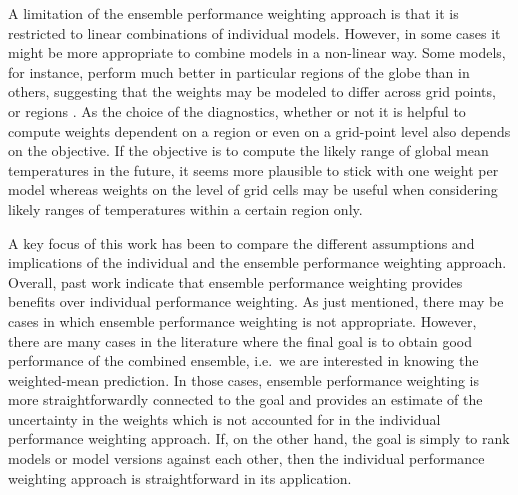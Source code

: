 A limitation of the ensemble performance weighting approach is that it is restricted to linear combinations of individual models. 
However, in some cases it might be more appropriate to combine models in a non-linear way.
Some models, for instance, perform much better in particular regions of the globe than in others, suggesting that the weights may be modeled to differ across grid points, or regions \citep[e.g.,][]{dasbhowmikPerformancebasedMultimodelCombination2021,thaoCombiningGlobalClimate2022}. 
As the choice of the diagnostics, whether or not it is helpful to compute weights dependent on a region or even on a grid-point level also depends on the objective. If the objective is to compute the likely range of global mean temperatures in the future, it seems more plausible to stick with one weight per model whereas weights on the level of grid cells may be useful when considering likely ranges of temperatures within a certain region only.

A key focus of this work has been to compare the different assumptions and implications of the individual  and the ensemble performance weighting approach. 
Overall, past work \citep{massoudGlobalClimateModel2019,massoudBayesianModelAveraging2020} indicate that ensemble performance weighting provides benefits over individual performance weighting. As just mentioned, there may be cases in which ensemble performance weighting is not appropriate. However, there are many cases in the literature where the final goal is to obtain good performance of the combined ensemble, i.e.~we are interested in knowing the weighted-mean prediction. In those cases, ensemble performance weighting is more straightforwardly connected to the goal and provides an estimate of the uncertainty in the weights which is not accounted for in the individual performance weighting approach. If, on the other hand, the goal is simply to rank models or model versions against each other, then the individual performance weighting approach is straightforward in its application. 


